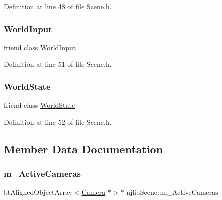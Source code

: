 Definition at line 48 of file Scene.\+h.

\mbox{\label{classnjli_1_1_scene_a5a2020205bbce2fe559331689dd5d3c4}} 
\subsubsection{\texorpdfstring{World\+Input}{WorldInput}}
{\footnotesize\ttfamily friend class \mbox{\hyperlink{classnjli_1_1_world_input}{World\+Input}}\hspace{0.3cm}{\ttfamily [friend]}}



Definition at line 51 of file Scene.\+h.

\mbox{\label{classnjli_1_1_scene_a59cdb6fe5b378389e35b8b2a2f4e990e}} 
\subsubsection{\texorpdfstring{World\+State}{WorldState}}
{\footnotesize\ttfamily friend class \mbox{\hyperlink{classnjli_1_1_world_state}{World\+State}}\hspace{0.3cm}{\ttfamily [friend]}}



Definition at line 52 of file Scene.\+h.



\subsection{Member Data Documentation}
\mbox{\label{classnjli_1_1_scene_a848fbc8e44f9607cf718c3873733303c}} 
\subsubsection{\texorpdfstring{m\+\_\+\+Active\+Cameras}{m\_ActiveCameras}}
{\footnotesize\ttfamily bt\+Aligned\+Object\+Array$<$\mbox{\hyperlink{classnjli_1_1_camera}{Camera}} $\ast$$>$$\ast$ njli\+::\+Scene\+::m\+\_\+\+Active\+Cameras\hspace{0.3cm}{\ttfamily [private]}}




